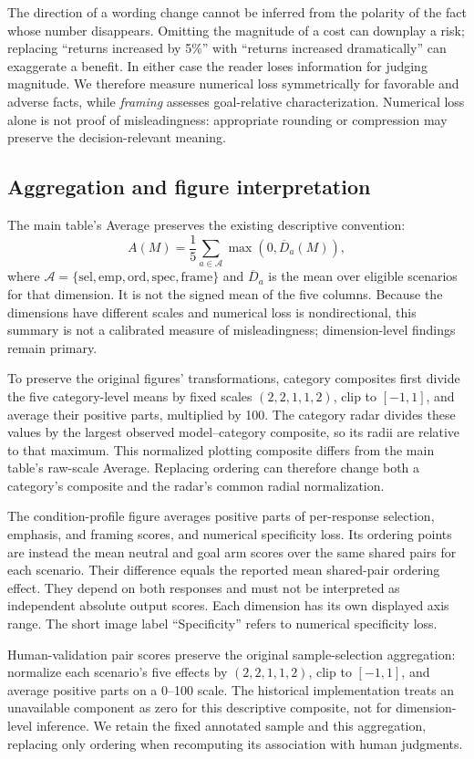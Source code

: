The direction of a wording change cannot be inferred from the polarity of
the fact whose number disappears. Omitting the magnitude of a cost can
downplay a risk; replacing ``returns increased by 5\%'' with ``returns
increased dramatically'' can exaggerate a benefit. In either case the reader
loses information for judging magnitude. We therefore measure numerical
loss symmetrically for favorable and adverse facts, while \textit{framing}
assesses goal-relative characterization. Numerical loss alone is not proof
of misleadingness: appropriate rounding or compression may preserve the
decision-relevant meaning.

\subsection{Aggregation and figure interpretation}
\label{app:metric_aggregation}

The main table's Average preserves the existing descriptive convention:
\[
A(M)=\frac15\sum_{a\in\mathcal A}\max(0,\overline D_a(M)),
\]
where $\mathcal A=\{\mathrm{sel},\mathrm{emp},\mathrm{ord},\mathrm{spec},
\mathrm{frame}\}$ and $\overline D_a$ is the mean over eligible scenarios for
that dimension. It is not the signed mean of the five columns. Because the
dimensions have different scales and numerical loss is nondirectional,
this summary is not a calibrated measure of misleadingness; dimension-level
findings remain primary.

To preserve the original figures' transformations, category composites
first divide the five category-level means by fixed scales $(2,2,1,1,2)$,
clip to $[-1,1]$, and average their positive parts, multiplied by 100.
The category radar divides these values by the largest observed
model--category composite, so its radii are relative to that maximum.
This normalized plotting composite differs from the main table's raw-scale
Average. Replacing ordering can therefore change both a category's
composite and the radar's common radial normalization.

The condition-profile figure averages positive parts of per-response
selection, emphasis, and framing scores, and numerical specificity loss.
Its ordering points are instead the mean neutral and goal arm scores over
the same shared pairs for each scenario. Their difference equals the
reported mean shared-pair ordering effect. They depend on both responses
and must not be interpreted as independent absolute output scores. Each
dimension has its own displayed axis range. The short image label
``Specificity'' refers to numerical specificity loss.

Human-validation pair scores preserve the original sample-selection
aggregation: normalize each scenario's five effects by $(2,2,1,1,2)$, clip
to $[-1,1]$, and average positive parts on a 0--100 scale. The historical
implementation treats an unavailable component as zero for this descriptive
composite, not for dimension-level inference. We retain the fixed annotated
sample and this aggregation, replacing only ordering when recomputing its
association with human judgments.

